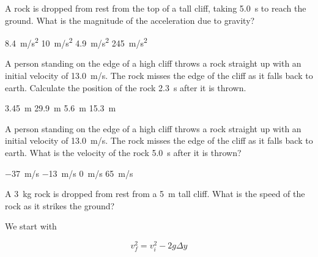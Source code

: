 \documentclass[]{exam}
\theoremstyle{definition}
\begin{document}
\begin{questions}

\question
A rock is dropped from rest from the top of a tall cliff, taking \SI{5.0}{s} to reach the ground. What is the magnitude of the acceleration due to gravity?

\begin{choices}
    \choice \SI{8.4}{m/s^2}
    \correctchoice \SI{10}{m/s^2}
    \choice \SI{4.9}{m/s^2}
    \choice \SI{245}{m/s^2}
\end{choices}




\question \label{prob:cliff_rock2}
A person standing on the edge of a high cliff throws a rock straight up with an initial velocity of \SI{13.0}{m/s}. The rock misses the edge of the cliff as it falls back to earth. Calculate the position of the rock \SI{2.3}{s} after it is thrown.

\begin{choices}
    \correctchoice \SI{3.45}{m}
    \choice \SI{29.9}{m}
    \choice \SI{5.6}{m}
    \choice \SI{15.3}{m}
\end{choices}

\question \label{prob:cliff_rock3}
A person standing on the edge of a high cliff throws a rock straight up with an initial velocity of \SI{13.0}{m/s}. The rock misses the edge of the cliff as it falls back to earth. What is the velocity of the rock \SI{5.0}{s} after it is thrown?

\begin{choices}
    \correctchoice \SI{-37}{m/s}
    \choice \SI{-13}{m/s}
    \choice \SI{0}{m/s}
    \choice \SI{65}{m/s}
\end{choices}


\question
A \SI{3}{kg} rock is dropped from rest from a \SI{5}{m} tall cliff. What is the speed of the rock as it strikes the ground?

\begin{solution}
We start with 

\begin{equation*}
    v_f^2 = v_i^2 - 2g \Delta y
\end{equation*}


\end{solution}
\end{questions}
\end{document}
